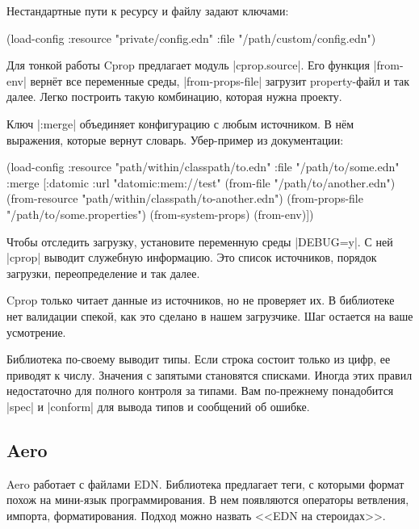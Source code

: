 Нестандартные пути к ресурсу и файлу задают ключами:

\begin{english}
  \begin{clojure}
(load-config
 :resource "private/config.edn"
 :file "/path/custom/config.edn")
  \end{clojure}
\end{english}

Для тонкой работы Cprop предлагает модуль \spverb|cprop.source|. Его функция
\spverb|from-env| верн\"{е}т все переменные среды, \spverb|from-props-file| загрузит
property-файл и так далее. Легко построить такую комбинацию, которая нужна
проекту.

Ключ \spverb|:merge| объединяет конфигурацию с любым источником. В н\"{е}м
выражения, которые вернут словарь. Убер-пример из документации:

\begin{english}
  \begin{clojure}
(load-config
 :resource "path/within/classpath/to.edn"
 :file "/path/to/some.edn"
 :merge [{:datomic {:url "datomic:mem://test"}}
         (from-file "/path/to/another.edn")
         (from-resource "path/within/classpath/to-another.edn")
         (from-props-file "/path/to/some.properties")
         (from-system-props)
         (from-env)])
  \end{clojure}
\end{english}

Чтобы отследить загрузку, установите переменную среды \spverb|DEBUG=y|. С ней
\spverb|cprop| выводит служебную информацию. Это список источников, порядок
загрузки, переопределение и так далее.

Cprop только читает данные из источников, но не проверяет их. В библиотеке нет
валидации спекой, как это сделано в нашем загрузчике. Шаг остается на ваше
усмотрение.

Библиотека по-своему выводит типы. Если строка состоит только из цифр, ее
приводят к числу. Значения с запятыми становятся списками. Иногда этих правил
недостаточно для полного контроля за типами. Вам по-прежнему понадобится
\spverb|spec| и \spverb|conform| для вывода типов и сообщений об ошибке.

\subsection{Aero}

Aero работает с файлами EDN. Библиотека
предлагает теги, с которыми формат похож на мини-язык программирования. В нем
появляются операторы ветвления, импорта, форматирования. Подход можно назвать
<<EDN на стероидах>>.

